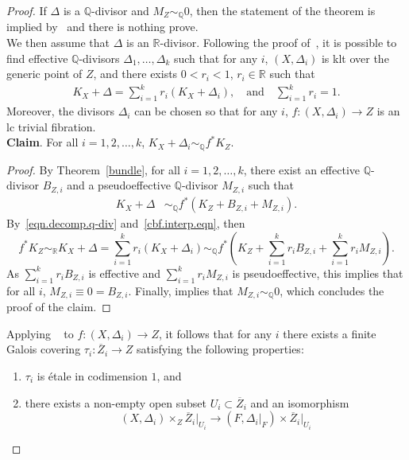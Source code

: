 \documentclass{amsart}[12pt,a4paper]
\theoremstyle{definition}
\begin{document}
\begin{proof}
If $\Delta$ is a $\mathbb{Q}$-divisor and $M_Z \sim_\mathbb{Q} 0$, then the statement of the theorem is implied by~\cite[Theorem~4.7]{Amb05} and there is nothing prove.
\\
We then assume that $\Delta$ is an $\mathbb{R}$-divisor.
Following the proof of~\cite[Theorem~3.1]{MR2944479}, it is possible to find effective $\mathbb{Q}$-divisors $\Delta_1, \dots, \Delta_k$ such that for any $i$, $(X, \Delta_i)$ is klt over the generic point of $Z$, and there exists $0<r_i<1$, $r_i \in \mathbb{R}$ such that 
\begin{align}
\label{eqn.decomp.q-div}
K_X+\Delta = \sum_{i=1}^k r_i (K_X+\Delta_i), \quad \text{and} \quad \sum_{i=1}^k r_i=1.
\end{align}
Moreover, the divisors $\Delta_i$ can be chosen so that for any $i$, $f \colon (X, \Delta_i) \to Z$ is an lc trivial fibration.
\\
{\bf Claim}. For all $i=1, 2, \dots, k$, $K_X+\Delta_i \sim_\mathbb{Q} f^\ast K_Z$.
\begin{proof}
By Theorem~\ref{bundle}, for all $i=1, 2, \dots, k$, there exist an effective $\mathbb Q$-divisor $B_{Z, i}$ and a pseudoeffective $\mathbb Q$-divisor $M_{Z, i}$ such that  
\begin{align}
\label{cbf.interp.eqn}
K_X+\Delta & \sim_\mathbb{Q} f^\ast (K_Z+B_{Z, i}+M_{Z, i}).
\end{align}
By~\eqref{eqn.decomp.q-div} and~\eqref{cbf.interp.eqn}, then 
\[
f^\ast K_Z \sim_\mathbb{R} 
K_X+\Delta = 
\sum_{i=1}^k r_i (K_X+\Delta_i) \sim_\mathbb{Q} 
f^\ast (K_Z+\sum_{i=1}^k r_i B_{Z, i}+\sum_{i=1}^k r_iM_{Z, i}).
\]
As $\sum_{i=1}^k r_i B_{Z, i}$ is effective and $\sum_{i=1}^k r_iM_{Z, i}$ is pseudoeffective, this implies that for all $i$, $M_{Z, i} \equiv 0 = B_{Z, i}$.
Finally, \cite[Theorem~1.3]{Flo} implies that $M_{Z, i} \sim_\mathbb{Q} 0$, which concludes the proof of the claim.
\end{proof}
Applying ~\cite[Theorem~4.7]{Amb05} to $f \colon (X, \Delta_i) \to Z$, it follows that for any $i$ there exists a finite Galois covering  $\tau_i \colon \overline{Z}_i \to Z$ satisfying the following properties: 
\begin{enumerate}
\item[(i)]
$\tau_i$ is \'etale in codimension $1$, and
\item[(ii)]
there exists a non-empty open subset $U_i\subset \overline{Z}_i$ and an isomorphism 
\[
(X,\Delta_i)\times_Z \overline{Z}_i \vert_{U_i} \rightarrow (F,\Delta_i\vert_F) \times \overline{Z}_i\vert_{U_i}
\]
\end{enumerate}
\end{proof}
\end{document}
